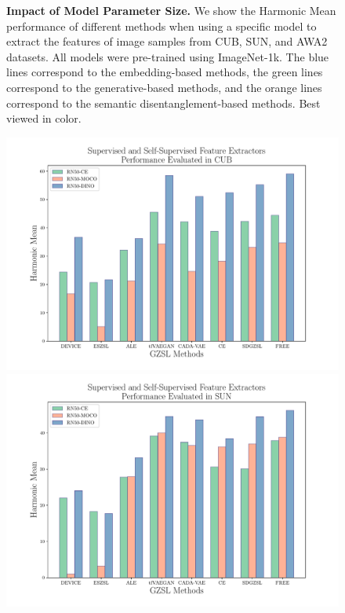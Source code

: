 \begin{figure}[tp]
\begin{minipage}[t]{0.35\textwidth}
\end{minipage}%
 \caption{\textbf{Impact of Model Parameter Size.} We show the Harmonic Mean performance of different methods when using a specific model to extract the features of image samples from CUB, SUN, and AWA2 datasets. All models were pre-trained using ImageNet-1k. The blue lines correspond to the embedding-based methods, the green lines correspond to the generative-based methods, and the orange lines correspond to the semantic disentanglement-based methods. Best viewed in color.}
 \label{fig:model_backbone_size_vs_method}
\end{figure}


\begin{figure}[bp]
\begin{minipage}[t]{0.33\textwidth}
  \includegraphics[align=t,width=\linewidth]{Images/cub_diff_objs.pdf}
\end{minipage}%
\hfill %
\begin{minipage}[t]{0.33\textwidth}
  \includegraphics[align=t,width=\linewidth]{Images/sun_diff_objs.pdf}

\end{minipage}
\end{figure}
